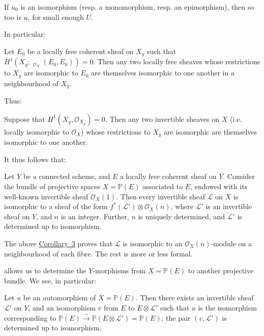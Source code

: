 \documentclass{article}
\theoremstyle{plain}
\newenvironment{proposition}[1]
  {\renewcommand\theinnercustomproposition{#1}\innercustomproposition}
  {\endinnercustomproposition}
\newenvironment{corollary}[1]
  {\renewcommand\theinnercustomcorollary{#1}\innercustomcorollary}
  {\endinnercustomcorollary}
\theoremstyle{definition}
\newcommand{\sh}[1]{{\mathscr{#1}}}
\newcommand{\PP}{\mathbb{P}}
\DeclareMathOperator{\Hom}{Hom}
\DeclareMathOperator{\shHom}{\underline{\Hom}}
\newcommand{\oldpage}[1]{\marginpar{\footnotesize$\Big\vert$ \textit{p.~#1}}}
\begin{document}
\begin{corollary}{1}
\label{theorem7corollary1}
  If $u_0$ is an isomorphism (resp. a monomorphism, resp. an epimorphism), then so too is $u$, for small enough $U$.
\end{corollary}

In particular:

\oldpage{182-10}
\begin{corollary}{2}
\label{theorem7corollary2}
  Let $E_0$ be a locally free coherent sheaf on $X_y$ such that $H^1(X_y;\shHom_{\sh{O}_X}(E_0,E_0))=0$.
  Then any two locally free sheaves whose restrictions to $X_y$ are isomorphic to $E_0$ are themselves isomorphic to one another in a neighbourhood of $X_y$.
\end{corollary}

Thus:

\begin{corollary}{3}
\label{theorem7corollary3}
  Suppose that $H^1(X_y,\sh{O}_{X_y})=0$.
  Then any two invertible sheaves on $X$ (i.e. locally isomorphic to $\sh{O}_X$) whose restrictions to $X_y$ are isomorphic are themselves isomorphic to one another.
\end{corollary}

It thus follows that:

\begin{proposition}{2}
\label{proposition2}
  Let $Y$ be a connected scheme, and $E$ a locally free coherent sheaf on $Y$.
  Consider the bundle of projective spaces $X=\PP(E)$ associated to $E$, endowed with its well-known invertible sheaf $\sh{O}_X(1)$.
  Then every invertible sheaf $\sh{L}$ on $X$ is isomorphic to a sheaf of the form $f^*(\sh{L}')\otimes\sh{O}_X(n)$, where $\sh{L}'$ is an invertible sheaf on $Y$, and $n$ is an integer.
  Further, $n$ is uniquely determined, and $\sh{L}'$ is determined up to isomorphism.
\end{proposition}

The above \hyperref[theorem7corollary3]{Corollary~3} proves that $\sh{L}$ is isomorphic to an $\sh{O}_X(n)$-module on a neighbourhood of each fibre.
The rest is more or less formal.

 allows us to determine the $Y$-morphisms from $X=\PP(E)$ to another projective bundle.
We see, in particular:

\begin{corollary}{1}
\label{proposition2corollary1}
  Let $u$ be an automorphism of $X=\PP(E)$.
  Then there exists an invertible sheaf $\sh{L}'$ on $Y$, and an isomorphism $v$ from $E$ to $E\otimes\sh{L}'$ such that $u$ is the isomorphism corresponding to $\PP(E)\xrightarrow{\sim}\PP(E\otimes\sh{L}')=\PP(E)$;
  the pair $(v,\sh{L}')$ is determined up to isomorphism.
\end{corollary}
\end{document}
